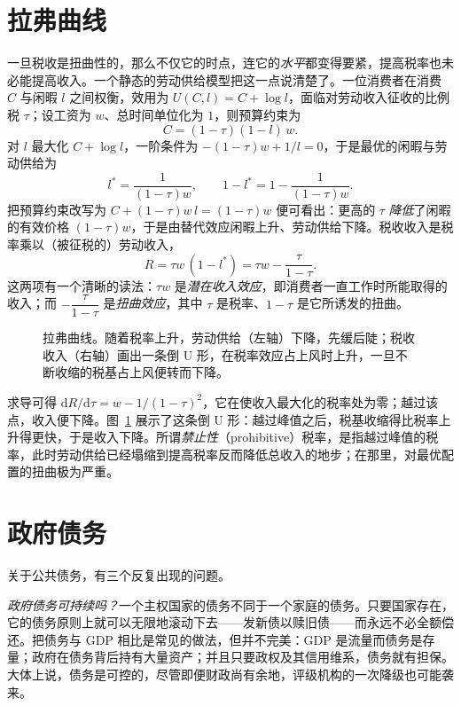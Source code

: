 \section{拉弗曲线}

一旦税收是扭曲性的，那么不仅它的时点，连它的\emph{水平}都变得要紧，提高税率也未必能提高收入。一个静态的劳动供给模型把这一点说清楚了。一位消费者在消费 $C$ 与闲暇 $l$ 之间权衡，效用为 $U(C,l)=C+\log l$，面临对劳动收入征收的比例税 $\tau$；设工资为 $w$、总时间单位化为 $1$，则预算约束为
\[
C = (1-\tau)(1-l)\,w.
\]
对 $l$ 最大化 $C+\log l$，一阶条件为 $-(1-\tau)w + 1/l = 0$，于是最优的闲暇与劳动供给为
\[
l^{*} = \frac{1}{(1-\tau)w}, \qquad 1 - l^{*} = 1 - \frac{1}{(1-\tau)w}.
\]
把预算约束改写为 $C + (1-\tau)w\,l = (1-\tau)w$ 便可看出：更高的 $\tau$ \emph{降低}了闲暇的有效价格 $(1-\tau)w$，于是由替代效应闲暇上升、劳动供给下降。税收收入是税率乘以（被征税的）劳动收入，
\[
R = \tau w\,(1-l^{*}) = \tau w - \frac{\tau}{1-\tau}.
\]
这两项有一个清晰的读法：$\tau w$ 是\emph{潜在收入效应}，即消费者一直工作时所能取得的收入；而 $-\dfrac{\tau}{1-\tau}$ 是\emph{扭曲效应}，其中 $\tau$ 是税率、$1-\tau$ 是它所诱发的扭曲。

\begin{figure}[h]
\centering

\caption{拉弗曲线。随着税率上升，劳动供给（左轴）下降，先缓后陡；税收收入（右轴）画出一条倒 U 形，在税率效应占上风时上升，一旦不断收缩的税基占上风便转而下降。}
\label{fig:macro-30}
\end{figure}

求导可得 $\mathrm{d}R/\mathrm{d}\tau = w - 1/(1-\tau)^2$，它在使收入最大化的税率处为零；越过该点，收入便下降。图~\ref{fig:macro-30} 展示了这条倒 U 形：越过峰值之后，税基收缩得比税率上升得更快，于是收入下降。所谓\emph{禁止性}（prohibitive）税率，是指越过峰值的税率，此时劳动供给已经塌缩到提高税率反而降低总收入的地步；在那里，对最优配置的扭曲极为严重。


\section{政府债务}

关于公共债务，有三个反复出现的问题。

\emph{政府债务可持续吗？}一个主权国家的债务不同于一个家庭的债务。只要国家存在，它的债务原则上就可以无限地滚动下去——发新债以赎旧债——而永远不必全额偿还。把债务与 GDP 相比是常见的做法，但并不完美：GDP 是流量而债务是存量；政府在债务背后持有大量资产；并且只要政权及其信用维系，债务就有担保。大体上说，债务是可控的，尽管即便财政尚有余地，评级机构的一次降级也可能袭来。


